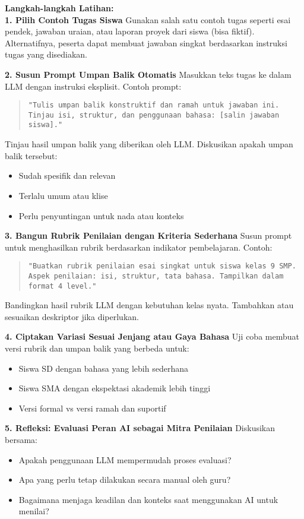 \textbf{Langkah-langkah Latihan:}\\

\textbf{1. Pilih Contoh Tugas Siswa}  
Gunakan salah satu contoh tugas seperti esai pendek, jawaban uraian, atau laporan proyek dari siswa (bisa fiktif). Alternatifnya, peserta dapat membuat jawaban singkat berdasarkan instruksi tugas yang disediakan.

\textbf{2. Susun Prompt Umpan Balik Otomatis}  
Masukkan teks tugas ke dalam LLM dengan instruksi eksplisit. Contoh prompt:

\begin{quote}
	\centering
	\texttt{"Tulis umpan balik konstruktif dan ramah untuk jawaban ini. Tinjau isi, struktur, dan penggunaan bahasa: [salin jawaban siswa]."}
\end{quote}

Tinjau hasil umpan balik yang diberikan oleh LLM. Diskusikan apakah umpan balik tersebut:
\begin{itemize}
	\item Sudah spesifik dan relevan
	\item Terlalu umum atau klise
	\item Perlu penyuntingan untuk nada atau konteks
\end{itemize}

\textbf{3. Bangun Rubrik Penilaian dengan Kriteria Sederhana}  
Susun prompt untuk menghasilkan rubrik berdasarkan indikator pembelajaran. Contoh:

\begin{quote}
	\centering
	\texttt{"Buatkan rubrik penilaian esai singkat untuk siswa kelas 9 SMP. Aspek penilaian: isi, struktur, tata bahasa. Tampilkan dalam format 4 level."}
\end{quote}

Bandingkan hasil rubrik LLM dengan kebutuhan kelas nyata. Tambahkan atau sesuaikan deskriptor jika diperlukan.

\textbf{4. Ciptakan Variasi Sesuai Jenjang atau Gaya Bahasa}  
Uji coba membuat versi rubrik dan umpan balik yang berbeda untuk:
\begin{itemize}
	\item Siswa SD dengan bahasa yang lebih sederhana
	\item Siswa SMA dengan ekspektasi akademik lebih tinggi
	\item Versi formal vs versi ramah dan suportif
\end{itemize}

\textbf{5. Refleksi: Evaluasi Peran AI sebagai Mitra Penilaian}  
Diskusikan bersama:
\begin{itemize}
	\item Apakah penggunaan LLM mempermudah proses evaluasi?
	\item Apa yang perlu tetap dilakukan secara manual oleh guru?
	\item Bagaimana menjaga keadilan dan konteks saat menggunakan AI untuk menilai?
\end{itemize}

